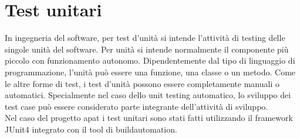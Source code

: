 \section{Test unitari}\label{sec:test-unitari}
In ingegneria del software, per test d'unità si intende l'attività di testing delle
singole unità del software.
Per unità si intende normalmente il componente più piccolo con funzionamento autonomo.
Dipendentemente dal tipo di linguaggio di programmazione, l'unità può essere una funzione, una classe o un metodo.
Come le altre forme di test, i test d'unità possono essere completamente manuali o automatici.
Specialmente nel caso dello unit testing automatico, lo sviluppo dei test case può essere considerato parte integrante dell'attività di sviluppo.\\
Nel caso del progetto \gls{apat} i test unitari sono stati fatti utilizzando il framework JUnit4\cite{site:junit4} integrato con il tool di \gls{buildautomation}.

\setcounter{rowcount}{0}

\setcounter{testCounter}{0}

